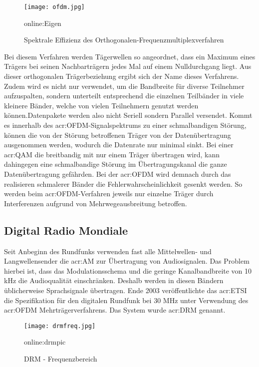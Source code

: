 \begin{figure}[H]
	\centering
	\texttt{[image: ofdm.jpg]}
	\caption[Spektrale Effizienz des Orthogonalen-Frequenzmultiplexverfahren]{Spektrale Effizienz des Orthogonalen-Frequenzmultiplexverfahren} 
	\gls{online:Eigen}
	\label{fig:ofdm}
\end{figure}

Bei diesem Verfahren werden Tägerwellen so angeordnet, dass ein Maximum eines Trägers
bei seinen Nachbarträgern jedes Mal auf einem Nulldurchgang liegt. Aus dieser orthogonalen Trägerbeziehung ergibt sich der Name dieses Verfahrens. Zudem wird es nicht nur verwendet, um die
Bandbreite für diverse Teilnehmer aufzuspalten, sondern unterteilt entsprechend die einzelnen
Teilbänder in viele kleinere Bänder, welche von vielen Teilnehmern genutzt werden können.Datenpakete werden also nicht Seriell sondern Parallel versendet. Kommt es innerhalb des \gls{acr:OFDM}-Signalspektrums zu einer schmalbandigen Störung, können die von der Störung betroffenen Träger von der Datenübertragung ausgenommen werden, wodurch die Datenrate nur minimal sinkt. Bei einer \gls{acr:QAM} die breitbandig mit nur einem Träger übertragen wird, kann dahingegen eine schmalbandige Störung im Übertragungskanal die ganze Datenübertragung gefährden. Bei der \gls{acr:OFDM} wird demnach durch das realisieren schmalerer Bänder die Fehlerwahrscheinlichkeit gesenkt werden. So werden beim \gls{acr:OFDM}-Verfahren jeweils nur einzelne Träger durch Interferenzen aufgrund von Mehrwegeausbreitung betroffen.

\subsection{Digital Radio Mondiale}
\label{subsec:drm}
Seit Anbeginn des Rundfunks verwenden fast alle Mittelwellen- und Langwellensender die \gls{acr:AM} zur Übertragung von Audiosignalen. Das Problem hierbei ist, dass das Modulationsschema und die geringe Kanalbandbreite von 10 kHz die Audioqualität einschränken. Deshalb werden in diesen Bändern üblicherweise Sprachsignale übertragen. Ende 2003 veröffentlichte das \gls{acr:ETSI} die Spezifikation für den digitalen Rundfunk bei 30 MHz unter Verwendung des \gls{acr:OFDM} Mehrträgerverfahrens. Das System wurde \gls{acr:DRM} genannt. 

\begin{figure}[H]
	\centering
	\texttt{[image: drmfreq.jpg]}
	\caption[DRM - Frequenzbereich]{DRM - Frequenzbereich} 
	\gls{online:drmpic}
	\label{fig:drmfreq}
\end{figure}

